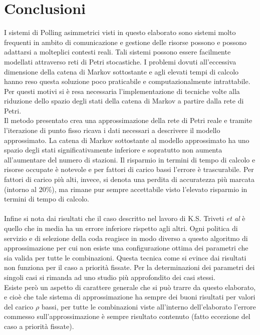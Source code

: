 \documentclass[12pt,a4paper,italian]{article}
\begin{document}
\section{Conclusioni}
\thispagestyle{plain}
I sistemi di Polling asimmetrici visti in questo elaborato sono sistemi molto frequenti in ambito di comunicazione e gestione delle risorse possono e possono adattarsi a molteplici contesti reali. Tali sistemi possono essere facilmente modellati attraverso reti di Petri stocastiche. I problemi dovuti all'eccessiva dimensione della catena di Markov sottostante e agli elevati tempi di calcolo hanno reso questa soluzione poco praticabile e computazionalmente intrattabile. Per questi motivi si è resa necessaria l'implementazione di tecniche volte alla riduzione dello spazio degli stati della catena di Markov a partire dalla rete di Petri. \\Il metodo presentato crea una approssimazione della rete di Petri reale e tramite l'iterazione di punto fisso ricava i dati necessari a descrivere il modello approssimato. La catena di Markov sottostante al modello approssimato ha uno spazio degli stati significativamente inferiore e sopratutto non aumenta all'aumentare del numero di stazioni. Il risparmio in termini di tempo di calcolo e risorse occupate è notevole e per fattori di carico bassi l'errore è trascurabile. Per fattori di carico più alti, invece, si denota una perdita di accuratezza più marcata (intorno al 20\%), ma rimane pur sempre accettabile visto l'elevato risparmio in termini di tempo di calcolo.\\
\\
Infine si nota dai risultati che il caso descritto nel lavoro di K.S. Triveti \emph{et al}\cite{fixedpoint} è quello che in media ha un errore inferiore rispetto agli altri. Ogni politica di servizio e di selezione della coda reagisce in modo diverso a questo algoritmo di approssimazione per cui non esiste una configurazione ottima dei parametri che sia valida per tutte le combinazioni. Questa tecnica come si evince dai risultati non funziona per il caso a priorità fissate. Per la determinazioni dei parametri dei singoli casi si rimanda ad uno studio più approfondito dei casi stessi.\\
Esiste però un aspetto di carattere generale che si può trarre da questo elaborato, e cioè che tale sistema di approssimazione ha sempre dei buoni risultati per valori del carico $\rho$ bassi, per tutte le combinazioni viste all'interno dell'elaborato l'errore commesso sull'approssimazione è sempre risultato contenuto (fatto eccezione del caso a priorità fissate).
\newpage
{\small
	
	\raggedright
	
}   
	
\end{document}
